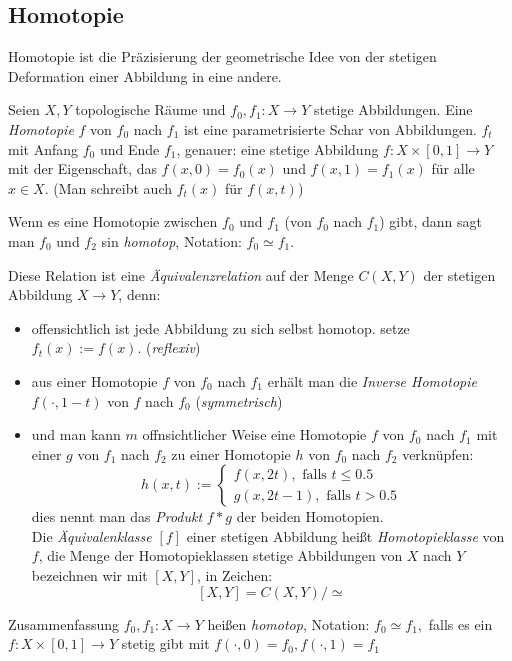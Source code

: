 \documentclass[a4paper,10pt]{scrartcl}
\begin{document}
\subsection{Homotopie}
Homotopie ist die Präzisierung der geometrische Idee von der stetigen Deformation einer Abbildung in eine andere.
\begin{df}[Homotopie]
 Seien $X,Y$ topologische Räume und $f_0, f_1: X\to Y$ stetige Abbildungen. Eine \emph{Homotopie} $f$ von $f_0$ nach $f_1$ ist eine parametrisierte Schar von Abbildungen.
$f_t$ mit Anfang $f_0$ und Ende $f_1$, genauer: eine stetige Abbildung $f: X\times[0,1] \to Y$ mit der Eigenschaft, das $f(x,0)=f_0(x)$ und $f(x,1)=f_1(x)$ für alle $x\in X$. (Man schreibt auch $f_t(x)$ für $f(x,t)$)

Wenn es eine Homotopie zwischen $f_0$ und $f_1$ (von $f_0$ nach $f_1$) gibt, dann sagt man $f_0$ und $f_2$ sin \emph{homotop}, Notation: $f_0 \simeq f_1$.
\end{df}
Diese Relation ist eine \emph{Äquivalenzrelation} auf der Menge $C(X,Y)$ der stetigen Abbildung $X\to Y$, denn:
\begin{itemize}
 \item offensichtlich ist jede Abbildung zu sich selbst homotop. setze $f_t(x):= f(x)$. (\emph{reflexiv})
 \item aus einer Homotopie $f$ von $f_0$ nach $f_1$ erhält man die \emph{Inverse Homotopie} $f(\cdot, 1-t)$ von $f$ nach $f_0$ (\emph{symmetrisch})
 \item und man kann $m$ offnsichtlicher Weise eine Homotopie $f$ von $f_0$ nach $f_1$ mit einer $g$ von $f_1$ nach $f_2$ zu einer Homotopie $h$ von $f_0$ nach $f_2$ verknüpfen:
\[
 h(x,t):=\begin{cases}f(x,2t), \text{ falls } t\le 0.5\\ g(x,2t-1), \text{ falls } t>0.5  \end{cases}
\]
dies nennt man das \emph{Produkt} $f*g$ der beiden Homotopien.\\
Die \emph{Äquivalenklasse} $[f]$ einer stetigen Abbildung heißt \emph{Homotopieklasse} von $f$, die Menge der Homotopieklassen stetige Abbildungen von $X$ nach $Y$ bezeichnen wir mit $[X,Y]$, in Zeichen:
\[
 [X,Y]=C(X,Y)/\simeq
\]
\end{itemize}
\begin{seg}{Zusammenfassung}
 $f_0, f_1: X\to Y$ heißen \emph{homotop}, Notation: $f_0 \simeq f_1,$ falls es ein $f: X\times [0,1] \to  Y$ stetig gibt mit $f(\cdot, 0)=f_0, f(\cdot, 1)=f_1$
\end{seg}
\end{document}
